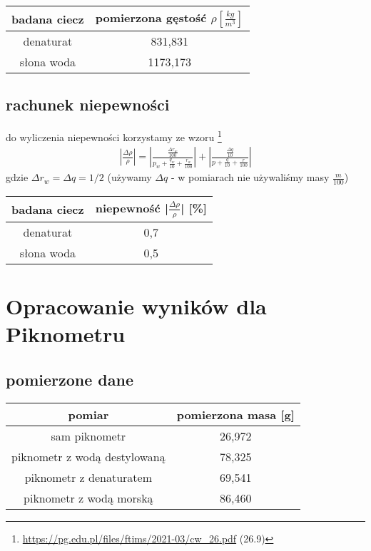 \documentclass{article}
\begin{document}
\begin{center}
\begin{tabular}{ c | c }
badana ciecz & pomierzona gęstość $\rho [\frac{kg}{m^3}]$\\
\hline
 denaturat  & 831,831\\  
 słona woda & 1173,173
\end{tabular}
\end{center}

\subsection{rachunek niepewności}
do wyliczenia niepewności korzystamy ze wzoru \footnote{\url{https://pg.edu.pl/files/ftims/2021-03/cw_26.pdf} (26.9)}
\begin{gather*}
	|\frac{\Delta \rho}{\rho}| = |\frac{\frac{\Delta r_w}{100}}{p_w+\frac{q_w}{10} + \frac{r_w}{100}}| + |\frac{\frac{\Delta q}{10}}{p+\frac{q}{10} + \frac{r}{100}}|
\end{gather*}
gdzie $\Delta r_w = \Delta q = 1/2$ (używamy $\Delta q$ - w pomiarach nie używaliśmy masy $\frac{m}{100}$)

\begin{center}
\begin{tabular}{ c | c }
badana ciecz & niepewność |$\frac{\Delta \rho}{\rho}$| [\%] \\
\hline
denaturat  & 0,7\\  
słona woda & 0,5
\end{tabular}
\end{center}

\section{Opracowanie wyników dla Piknometru}

\subsection{pomierzone dane}
\begin{center}
\begin{tabular}{ c | c }
pomiar & pomierzona masa [g]  \\
\hline
sam piknometr &  26,972  \\ 
piknometr z wodą destylowaną& 78,325  \\  
piknometr z denaturatem & 69,541 \\
piknometr z wodą morską & 86,460    
\end{tabular}
\end{center}
\end{document}
